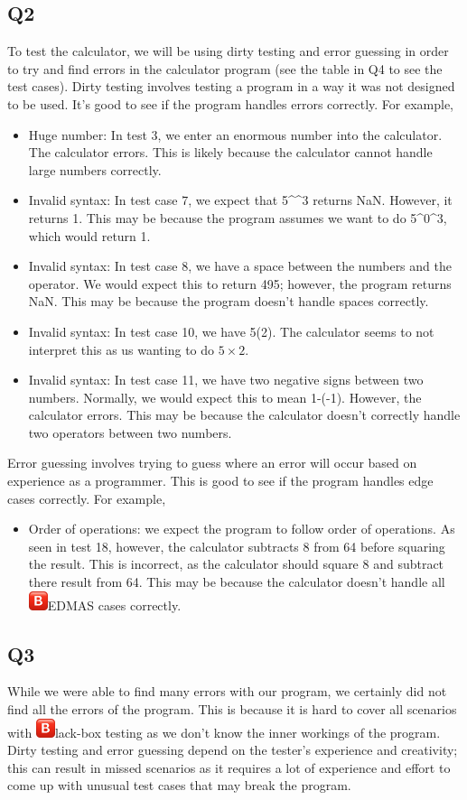 \documentclass[12pt, letterpaper, titlepage]{article}
\newcommand{\B}{\includegraphics[height=1.5em, valign=B, raise=-0.2em]{BigB.png}}
\begin{document}
\subsection*{Q2}
To test the calculator, we will be using dirty testing and error guessing in order to try and find errors in the calculator program (see the table in Q4 to see the test cases). Dirty testing involves testing a program in a way it was not designed to be used. It's good to see if the program handles errors correctly. For example,
\begin{itemize}
    \item Huge number: In test 3, we enter an enormous number into the calculator. The calculator errors. This is likely because the calculator cannot handle large numbers correctly.
    \item Invalid syntax: In test case 7, we expect that 5\textasciicircum{}\textasciicircum{}3 returns NaN. However, it returns 1. This may be because the program assumes we want to do 5\textasciicircum{}0\textasciicircum{}3, which would return 1.
    \item Invalid syntax: In test case 8, we have a space between the numbers and the operator. We would expect this to return 495; however, the program returns NaN. This may be because the program doesn't handle spaces correctly.
    \item Invalid syntax: In test case 10, we have 5(2). The calculator seems to not interpret this as us wanting to do $5\times2$.
    \item Invalid syntax: In test case 11, we have two negative signs between two numbers. Normally, we would expect this to mean 1-(-1). However, the calculator errors. This may be because the calculator doesn't correctly handle two operators between two numbers.
\end{itemize}
Error guessing involves trying to guess where an error will occur based on experience as a programmer. This is good to see if the program handles edge cases correctly. For example,
\begin{itemize}
    \item Order of operations: we expect the program to follow order of operations. As seen in test 18, however, the calculator subtracts 8 from 64 before squaring the result. This is incorrect, as the calculator should square 8 and subtract there result from 64. This may be because the calculator doesn't handle all \B EDMAS cases correctly.
\end{itemize}

\subsection*{Q3}
While we were able to find many errors with our program, we certainly did not find all the errors of the program. This is because it is hard to cover all scenarios with \B lack-box testing as we don't know the inner workings of the program. Dirty testing and error guessing depend on the tester's experience and creativity; this can result in missed scenarios as it requires a lot of experience and effort to come up with unusual test cases that may break the program.
\end{document}
